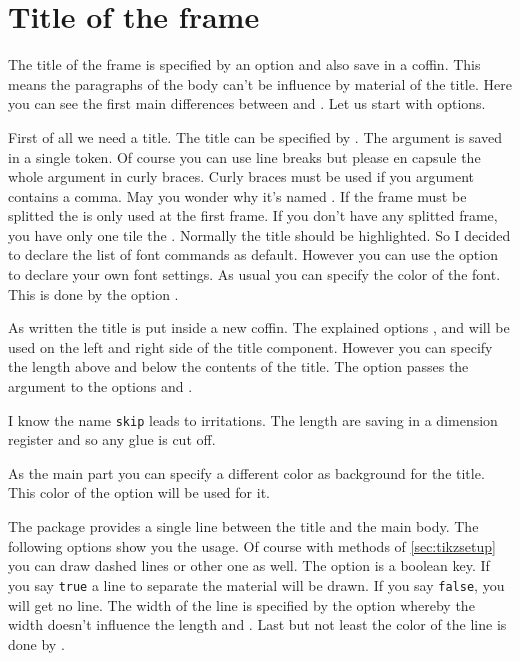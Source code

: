\documentclass[openany,12pt,tocdepth=3]{ltx-md}
\begin{document}
\section{Title of the frame}\label{sec:element-firsttitle}
The title of the frame is specified by an option and also save in a coffin. 
This means the paragraphs of the body can't be influence by material
of the title. Here you can see the first main differences between
 and . Let us start with options.

First of all we need a title. The title can be specified by . The argument
is saved in a single token. Of course you can use line breaks but please en capsule
the whole argument in curly braces. Curly braces must be used if you argument contains
a comma. May you wonder why it's named . If the frame
must be splitted the  is only used at the first frame. If
you don't have any splitted frame, you have only one tile the .
Normally the title should be highlighted. So I decided to declare the list of
font commands as default. However you can use the option  to
declare your own font settings.
As usual you can specify the color of the font. This is done by the option
.

As written the title is put inside a new coffin. The explained options ,
 and  will be used on the left and right side of
the title component. However you can specify the length above and below the contents of the title. 
The option  passes the argument to the options 
and .


\begin{Note}
I know the name \texttt{skip} leads to irritations. The length are saving in a
dimension register and so any glue  is cut off.
\end{Note}

As the main part you can specify a different color as background for
the title. This color of the option  will be used for it.


The package  provides a single line between the title and the main body.
The following options show you the usage. Of course with methods of
\autoref{sec:tikzsetup} you can draw dashed lines or other one as well.
The option  is a boolean key. If you say \texttt{true} a line to separate
the material will be drawn. If you say \texttt{false}, you will get no line.
The width of the line is specified by the option  whereby
the width doesn't influence the length  and .
Last but not least the color of the line is done by .
\end{document}
